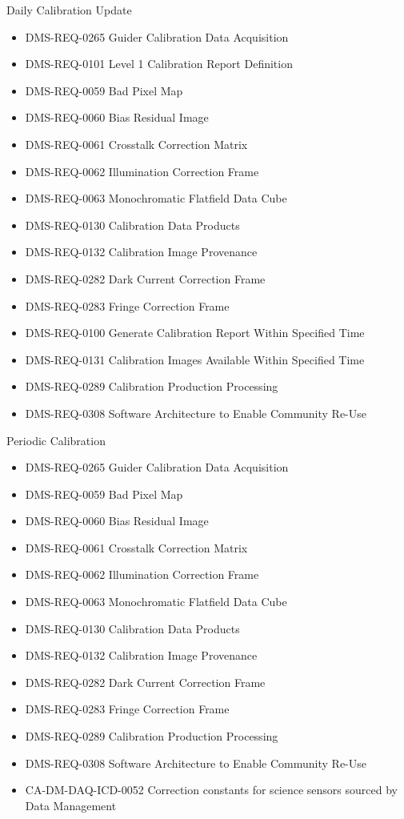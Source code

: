 Daily Calibration Update \begin{itemize}
\item DMS-REQ-0265 Guider Calibration Data Acquisition
\item DMS-REQ-0101 Level 1 Calibration Report Definition
\item DMS-REQ-0059 Bad Pixel Map
\item DMS-REQ-0060 Bias Residual Image
\item DMS-REQ-0061 Crosstalk Correction Matrix
\item DMS-REQ-0062 Illumination Correction Frame
\item DMS-REQ-0063 Monochromatic Flatfield Data Cube
\item DMS-REQ-0130 Calibration Data Products
\item DMS-REQ-0132 Calibration Image Provenance
\item DMS-REQ-0282 Dark Current Correction Frame
\item DMS-REQ-0283 Fringe Correction Frame
\item DMS-REQ-0100 Generate Calibration Report Within Specified Time
\item DMS-REQ-0131 Calibration Images Available Within Specified Time
\item DMS-REQ-0289 Calibration Production Processing
\item DMS-REQ-0308 Software Architecture to Enable Community Re-Use
\end{itemize}
Periodic Calibration \begin{itemize}
\item DMS-REQ-0265 Guider Calibration Data Acquisition
\item DMS-REQ-0059 Bad Pixel Map
\item DMS-REQ-0060 Bias Residual Image
\item DMS-REQ-0061 Crosstalk Correction Matrix
\item DMS-REQ-0062 Illumination Correction Frame
\item DMS-REQ-0063 Monochromatic Flatfield Data Cube
\item DMS-REQ-0130 Calibration Data Products
\item DMS-REQ-0132 Calibration Image Provenance
\item DMS-REQ-0282 Dark Current Correction Frame
\item DMS-REQ-0283 Fringe Correction Frame
\item DMS-REQ-0289 Calibration Production Processing
\item DMS-REQ-0308 Software Architecture to Enable Community Re-Use
\item CA-DM-DAQ-ICD-0052 Correction constants for science sensors sourced by Data Management
\end{itemize}

